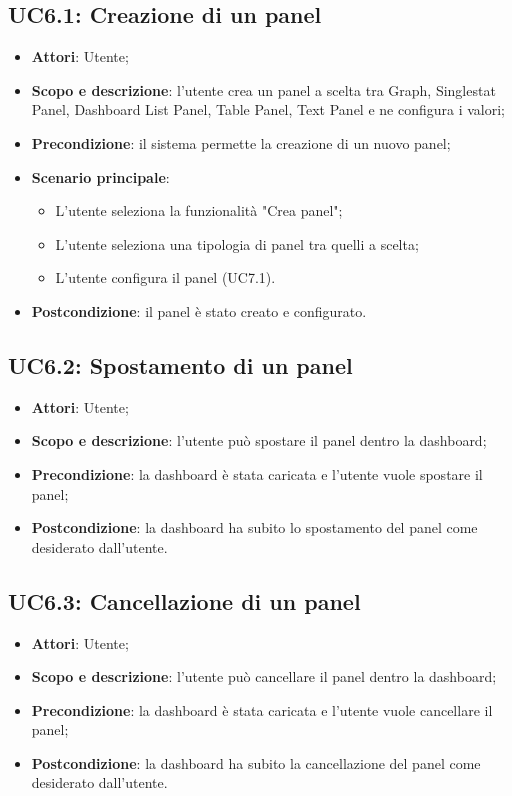 \subsection{UC6.1: Creazione di un panel}
\hypertarget{UC6.1}{}
\begin{itemize}
	\item \textbf{Attori}: Utente;
	\item \textbf{Scopo e descrizione}: l'utente crea un panel a scelta tra Graph, Singlestat Panel, Dashboard List Panel, Table Panel, Text Panel e ne configura i valori;
	\item \textbf{Precondizione}: il sistema permette la creazione di un nuovo panel;
	\item \textbf{Scenario principale}:
	\begin{itemize}
		\item L'utente seleziona la funzionalità "Crea panel";
		\item L'utente seleziona una tipologia di panel tra quelli a scelta;
		\item L'utente configura il panel (UC7.1).
	\end{itemize}
	\item \textbf{Postcondizione}: il panel è stato creato e configurato.
\end{itemize}
\subsection{UC6.2: Spostamento di un panel}
\hypertarget{UC6.2}{}
\begin{itemize}
	\item \textbf{Attori}: Utente;
	\item \textbf{Scopo e descrizione}: l'utente può spostare il panel dentro la dashboard;
	\item \textbf{Precondizione}: la dashboard è stata caricata e l'utente vuole spostare il panel;
	\item \textbf{Postcondizione}: la dashboard ha subito lo spostamento del panel come desiderato dall'utente.
\end{itemize}
\subsection{UC6.3: Cancellazione di un panel}
\hypertarget{UC6.3}{}
\begin{itemize}
	\item \textbf{Attori}: Utente;
	\item \textbf{Scopo e descrizione}: l'utente può cancellare il panel dentro la dashboard;
	\item \textbf{Precondizione}: la dashboard è stata caricata e l'utente vuole cancellare il panel;
	\item \textbf{Postcondizione}: la dashboard ha subito la cancellazione del panel come desiderato dall'utente.
\end{itemize}
